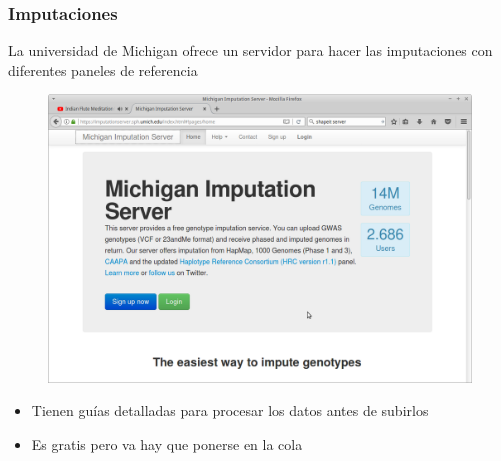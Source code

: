 \documentclass{beamer}\usepackage[]{graphicx}\usepackage[]{color}
\begin{document}
\begin{frame}[fragile]
\frametitle{Imputaciones}
La universidad de Michigan ofrece un servidor para hacer las imputaciones con diferentes paneles de referencia

\begin{figure}[htbp]
\begin{center}
\includegraphics[width=.7\linewidth]{michigan.png}
\end{center}
\end{figure}

\begin{itemize}
\item Tienen gu\'ias detalladas para procesar los datos antes de subirlos
\item Es gratis pero va hay que ponerse en la cola 
\end{itemize}

\end{frame}
\end{document}
